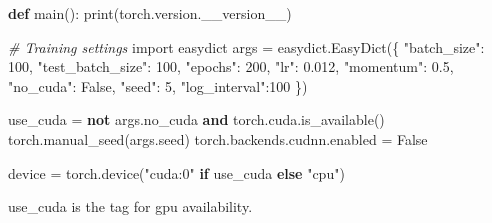 \documentclass[
]{article}
\newenvironment{Shaded}{}{}
\newcommand{\BuiltInTok}[1]{#1}
\newcommand{\CommentTok}[1]{\textcolor[rgb]{0.38,0.63,0.69}{\textit{#1}}}
\newcommand{\ControlFlowTok}[1]{\textcolor[rgb]{0.00,0.44,0.13}{\textbf{#1}}}
\newcommand{\DecValTok}[1]{\textcolor[rgb]{0.25,0.63,0.44}{#1}}
\newcommand{\FloatTok}[1]{\textcolor[rgb]{0.25,0.63,0.44}{#1}}
\newcommand{\ImportTok}[1]{#1}
\newcommand{\KeywordTok}[1]{\textcolor[rgb]{0.00,0.44,0.13}{\textbf{#1}}}
\newcommand{\NormalTok}[1]{#1}
\newcommand{\OperatorTok}[1]{\textcolor[rgb]{0.40,0.40,0.40}{#1}}
\newcommand{\StringTok}[1]{\textcolor[rgb]{0.25,0.44,0.63}{#1}}
\newcommand{\VariableTok}[1]{\textcolor[rgb]{0.10,0.09,0.49}{#1}}
\begin{document}
\begin{Shaded}
\begin{Highlighting}[]
\KeywordTok{def}\NormalTok{ main():}
    \BuiltInTok{print}\NormalTok{(torch.version.\_\_version\_\_)}
    
    \CommentTok{\# Training settings}
    \ImportTok{import}\NormalTok{ easydict}
\NormalTok{    args }\OperatorTok{=}\NormalTok{ easydict.EasyDict(\{}
      \StringTok{"batch\_size"}\NormalTok{: }\DecValTok{100}\NormalTok{,}
      \StringTok{"test\_batch\_size"}\NormalTok{: }\DecValTok{100}\NormalTok{,}
      \StringTok{"epochs"}\NormalTok{: }\DecValTok{200}\NormalTok{,}
      \StringTok{"lr"}\NormalTok{: }\FloatTok{0.012}\NormalTok{,}
      \StringTok{"momentum"}\NormalTok{: }\FloatTok{0.5}\NormalTok{,}
      \StringTok{"no\_cuda"}\NormalTok{: }\VariableTok{False}\NormalTok{,}
      \StringTok{"seed"}\NormalTok{: }\DecValTok{5}\NormalTok{,}
      \StringTok{"log\_interval"}\NormalTok{:}\DecValTok{100}
\NormalTok{    \})}
\end{Highlighting}
\end{Shaded}

\begin{Shaded}
\begin{Highlighting}[]
\NormalTok{    use\_cuda }\OperatorTok{=} \KeywordTok{not}\NormalTok{ args.no\_cuda }\KeywordTok{and}\NormalTok{ torch.cuda.is\_available()}
\NormalTok{    torch.manual\_seed(args.seed)}
\NormalTok{    torch.backends.cudnn.enabled }\OperatorTok{=} \VariableTok{False}
   
\NormalTok{    device }\OperatorTok{=}\NormalTok{ torch.device(}\StringTok{"cuda:0"} \ControlFlowTok{if}\NormalTok{ use\_cuda }\ControlFlowTok{else} \StringTok{"cpu"}\NormalTok{)}
\end{Highlighting}
\end{Shaded}

use\_cuda is the tag for gpu availability.
\end{document}
